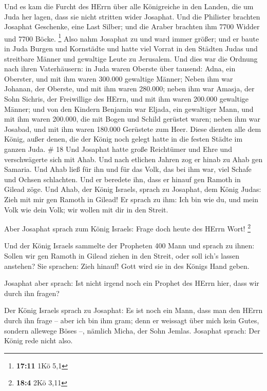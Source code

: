  Und es kam die Furcht des HErrn über alle Königreiche in
den Landen, die um Juda her lagen, dass sie nicht stritten wider
Josaphat.  Und die Philister brachten Josaphat Geschenke,
eine Last Silber; und die Araber brachten ihm 7700 Widder und 7700
Böcke. \footnote{\textbf{17:11} 1Kö 5,1}  Also nahm
Josaphat zu und ward immer größer; und er baute in Juda Burgen und
Kornstädte  und hatte viel Vorrat in den Städten Judas und
streitbare Männer und gewaltige Leute zu Jerusalem.  Und
dies war die Ordnung nach ihren Vaterhäusern: in Juda waren Oberste über
tausend: Adna, ein Oberster, und mit ihm waren 300.000 gewaltige Männer;
 Neben ihm war Johanan, der Oberste, und mit ihm waren
280.000;  neben ihm war Amasja, der Sohn Sichris, der
Freiwillige des HErrn, und mit ihm waren 200.000 gewaltige Männer;
 und von den Kindern Benjamin war Eljada, ein gewaltiger
Mann, und mit ihm waren 200.000, die mit Bogen und Schild gerüstet
waren;  neben ihm war Josabad, und mit ihm waren 180.000
Gerüstete zum Heer.  Diese dienten alle dem König, außer
denen, die der König noch gelegt hatte in die festen Städte im ganzen
Juda. \# 18  Und Josaphat hatte große Reichtümer und Ehre
und verschwägerte sich mit Ahab.  Und nach etlichen Jahren
zog er hinab zu Ahab gen Samaria. Und Ahab ließ für ihn und für das
Volk, das bei ihm war, viel Schafe und Ochsen schlachten. Und er
beredete ihn, dass er hinauf gen Ramoth in Gilead zöge.  Und
Ahab, der König Israels, sprach zu Josaphat, dem König Judas: Zieh mit
mir gen Ramoth in Gilead! Er sprach zu ihm: Ich bin wie du, und mein
Volk wie dein Volk; wir wollen mit dir in den Streit.

 Aber Josaphat sprach zum König Israels: Frage doch heute
des HErrn Wort! \footnote{\textbf{18:4} 2Kö 3,11}

 Und der König Israels sammelte der Propheten 400 Mann und
sprach zu ihnen: Sollen wir gen Ramoth in Gilead ziehen in den Streit,
oder soll ich's lassen anstehen? Sie sprachen: Zieh hinauf! Gott wird
sie in des Königs Hand geben.

 Josaphat aber sprach: Ist nicht irgend noch ein Prophet des
HErrn hier, dass wir durch ihn fragen?

 Der König Israels sprach zu Josaphat: Es ist noch ein Mann,
dass man den HErrn durch ihn frage -- aber ich bin ihm gram; denn er
weissagt über mich kein Gutes, sondern allewege Böses --, nämlich Micha,
der Sohn Jemlas. Josaphat sprach: Der König rede nicht also.

